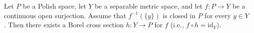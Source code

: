 Let $P$ be a Polish space, let $Y$ be a separable metric space, and let $f: P \to Y$ be a continuous open surjection. Assume that $f^{-1}(\{y\})$ is closed in $P$ for every $y \in Y$. Then there exists a Borel cross section $h: Y \to P$ for $f$ (i.e., $f \circ h = \text{id}_Y$).

